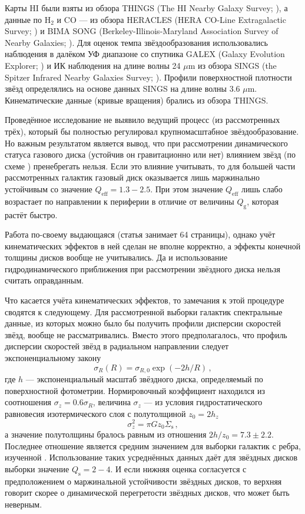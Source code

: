 \documentclass[russian,12pt]{article}
\def\be{\begin{equation}}
\def\ee{\end{equation}}
\begin{document}
Карты HI были взяты из обзора THINGS 
(The HI Nearby Galaxy Survey; \citealp{Walter+08}), 
а данные по H$_2$ и CO --- из обзора HERACLES 
(HERA CO-Line Extragalactic Survey; \citealp{Leroy+08}) 
и BIMA SONG 
(Berkeley-Illinois-Maryland Association Survey of Nearby Galaxies; 
\citealp{Helfer+03}). 
Для оценок темпа звёздообразования использовались наблюдения в далёком УФ 
диапазоне со спутника GALEX (Galaxy Evolution Explorer; 
\citealp{GildePaz+07}) 
и ИК наблюдения на длине волны 24 $\mu$m из обзора SINGS 
(the Spitzer Infrared Nearby Galaxies Survey; \citealp{Kennicutt+03}).
Профили поверхностной плотности звёзд определялись на основе данных SINGS 
на длине волны 3.6 $\mu$m. Кинематические данные (кривые вращения) 
брались из обзора THINGS.

Проведённое исследование не выявило ведущий процесс (из рассмотренных 
трёх), который бы полностью регулировал крупномасштабное 
звёздообразование. Но важным результатом является вывод, что при 
рассмотрении динамического статуса газового диска (устойчив он 
гравитационно или нет) влиянием звёзд (по схеме \citealp{JS84}) 
пренебрегать нельзя. Если это влияние учитывать, то для большей части 
рассмотренных галактик газовый диск оказывается лишь маржинально 
устойчивым со значение $Q_\mathrm{eff}=1.3-2.5$. При этом значение 
$Q_\mathrm{eff}$ лишь слабо возрастает по направлении к периферии в 
отличие от величины $Q_\mathrm{g}$, которая растёт быстро.

Работа \cite{Leroy+08} по-своему выдающаяся (статья занимает 64 
страницы), однако учёт кинематических эффектов в ней сделан не вполне 
корректно, а эффекты конечной толщины дисков вообще не учитывались. Да 
и использование гидродинамического приближения при рассмотрении 
звёздного диска нельзя считать оправданным. 

Что касается учёта кинематических эффектов, то замечания к этой 
процедуре сводятся к следующему. Для рассмотренной выборки галактик 
спектральные данные, из которых можно было бы получить профили 
дисперсии скоростей звёзд, вообще не рассматривались. Вместо этого 
предполагалось, что профиль дисперсии скоростей звёзд в радиальном 
направлении следует экспоненциальному закону
$$
\sigma_R(R) = \sigma_{R,0} \exp(-2h/R) \, ,
$$
где $h$ --- экспоненциальный масштаб звёздного диска, определяемый по 
поверхностной фотометрии. Нормировочный коэффициент находился из 
соотношения $\sigma_z = 0.6 \sigma_R$, величина $\sigma_z$ --- из 
условия гидростатического равновесия изотермического слоя с полутолщиной 
$z_0 = 2 h_z$
\be
\sigma_z^2 = \pi G z_0 \Sigma_\mathrm{s} \, ,
\label{equil_z}
\ee
а значение полутолщины бралось равным из отношения $2h/z_0 = 7.3 \pm 2.2$. 
Последнее отношение является средним значением для выборки галактик с ребра, 
изученной \cite{Kregel+02}. Использование таких усреднённых данных даёт 
для звёздных дисков выборки значение $Q_\mathrm{s} = 2-4$. И если 
нижняя оценка согласуется с предположением о маржинальной устойчивости 
звёздных дисков, то верхняя говорит скорее о динамической перегретости 
звёздных дисков, что может быть неверным.
\end{document}
